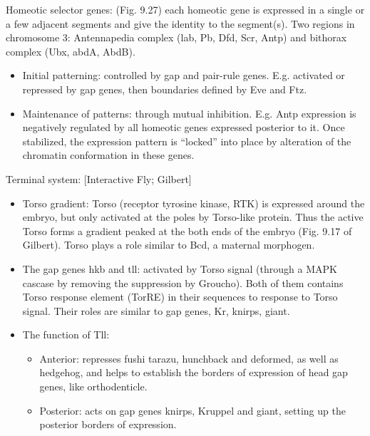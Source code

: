 \documentclass{report}
\begin{document}
Homeotic selector genes: (Fig. 9.27) each homeotic gene is expressed in a single or a few adjacent segments and give the identity to the segment(s). Two regions in chromosome 3: Antennapedia complex (lab, Pb, Dfd, Scr, Antp) and bithorax complex (Ubx, abdA, AbdB). 
\begin{itemize}
\item Initial patterning: controlled by gap and pair-rule genes. E.g. activated or repressed by gap genes, then boundaries defined by Eve and Ftz. 
\item Maintenance of patterns: through mutual inhibition. E.g. Antp expression is negatively regulated by all homeotic genes expressed posterior to it. Once stabilized, the expression pattern is ``locked'' into place by alteration of the chromatin conformation in these genes. 
\end{itemize}

Terminal system: [Interactive Fly; Gilbert]
\begin{itemize}
\item Torso gradient: Torso (receptor tyrosine kinase, RTK) is expressed around the embryo, but only activated at the poles by Torso-like protein. Thus the active Torso forms a gradient peaked at the both ends of the embryo (Fig. 9.17 of Gilbert). Torso plays a role similar to Bcd, a maternal morphogen.
\item The gap genes hkb and tll: activated by Torso signal (through a MAPK cascase by removing the suppression by Groucho). Both of them contains Torso response element (TorRE) in their sequences to response to Torso signal. Their roles are similar to gap genes, Kr, knirps, giant. 
\item The function of Tll: 
\begin{itemize}
\item Anterior: represses fushi tarazu, hunchback and deformed, as well as hedgehog, and helps to establish the borders of expression of head gap genes, like orthodenticle. 
\item Posterior: acts on gap genes knirps, Kruppel and giant, setting up the posterior borders of expression.
\end{itemize}
\end{itemize}
\end{document}
